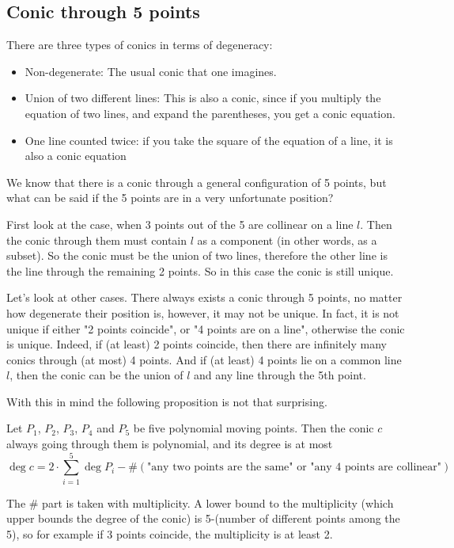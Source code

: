 \documentclass[a4paper]{article}
\begin{document}
\subsection{Conic through 5 points}

There are three types of conics in terms of degeneracy:
\begin{itemize}
    \item Non-degenerate: The usual conic that one imagines.
    \item Union of two different lines: This is also a conic, since if you multiply the equation of two lines, and expand the parentheses, you get a conic equation.
    \item One line counted twice: if you take the square of the equation of a line, it is also a conic equation
\end{itemize}

We know that there is a conic through a general configuration of 5 points, but what can be said if the 5 points are in a very unfortunate position?

First look at the case, when 3 points out of the 5 are collinear on a line $l$. Then the conic through them must contain $l$ as a component (in other words, as a subset). So the conic must be the union of two lines, therefore the other line is the line through the remaining 2 points. So in this case the conic is still unique.


Let's look at other cases. There always exists a conic through 5 points, no matter how degenerate their position is, however, it may not be unique. In fact, it is not unique if either "2 points coincide", or "4 points are on a line", otherwise the conic is unique. Indeed, if (at least) 2 points coincide, then there are infinitely many conics through (at most) 4 points. And if (at least) 4 points lie on a common line $l$, then the conic can be the union of $l$ and any line through the 5th point.


With this in mind the following proposition is not that surprising.

\begin{theorem}\label{conicthr5}
    Let $P_1$, $P_2$, $P_3$, $P_4$ and $P_5$ be five polynomial moving points. Then the conic $c$ always going through them is polynomial, and its degree is at most
    $$\deg c= 2\cdot\sum_{i=1}^5\deg P_i-\#(\text{"any two points are the same" or "any 4 points are collinear"})$$
\end{theorem}
\begin{remark}
    The $\#$ part is taken with multiplicity. A lower bound to the multiplicity (which upper bounds the degree of the conic) is 5-(number of different points among the 5), so for example if 3 points coincide, the multiplicity is at least 2.
\end{remark}
\end{document}
